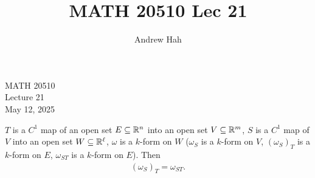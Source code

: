 \documentclass[11pt]{article}
\title{MATH 20510 Lec 21}
\author{Andrew Hah}
\begin{document}
\pagestyle{plain}
\begin{center}
{\Large MATH 20510} \\
{\Large Lecture 21} \\
\vspace{.2in}
May 12, 2025
\end{center}

\begin{theorem} $T$ is a $C^1$ map of an open set $E \subseteq \mathbb{R}^n$ into an open set $V \subseteq \mathbb{R}^m$, $S$ is a $C^1$ map of $V$ into an open set $W \subseteq \mathbb{R}^{\ell}$, $\omega$ is a $k$-form on $W$ ($\omega_S$ is a $k$-form on $V$, $(\omega_S)_{T}$ is a $k$-form on $E$, $\omega_{ST}$ is a $k$-form on $E$). Then \begin{align*} (\omega_S)_T = \omega_{ST}.
\end{align*}
\end{theorem}
\end{document}
